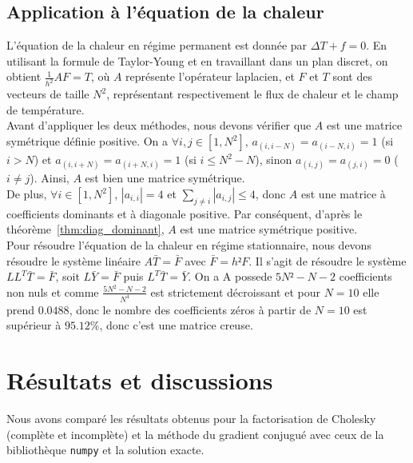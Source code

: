 \documentclass{article}
\begin{document}
\subsection{Application à l’équation de la chaleur}
L’équation de la chaleur en régime permanent est donnée par $\Delta T + f = 0$. En utilisant la formule de Taylor-Young et en travaillant dans un plan discret, on obtient $\frac{1}{h^2}AF=T$, où $A$ représente l'opérateur laplacien, et $F$ et $T$ sont des vecteurs de taille $N^2$, représentant respectivement le flux de chaleur et le champ de température.\\
Avant d'appliquer les deux méthodes, nous devons vérifier que $A$ est une matrice symétrique définie positive. On a $\forall i,j \in [1,N^2]$, $a_{(i,i-N)}=a_{(i-N,i)}=1$ (si $i>N$) et $a_{(i,i+N)}=a_{(i+N,i)}=1$ (si $i \leq N^2-N$), sinon $a_{(i,j)}=a_{(j,i)}=0$ ($i \neq j$). Ainsi, $A$ est bien une matrice symétrique.\\
De plus, $\forall i \in [1,N^2]$, $|a_{i,i}|=4$ et $\sum_{j \neq i} |a_{i,j}| \leq 4$, donc $A$ est une matrice à coefficients dominants et à diagonale positive. Par conséquent, d'après le théorème~\ref{thm:diag_dominant}, $A$ est une matrice symétrique positive.\\
Pour résoudre l'équation de la chaleur en régime stationnaire, nous devons résoudre le système linéaire $A\bar{T}=\bar{F}$ avec $\bar{F}=h²F$.
Il s'agit de résoudre le système $LL^T\bar{T}=\bar{F}$, soit $L\bar{Y}=\bar{F}$ puis $L^T\bar{T}=\bar{Y}$.
On a A possede $5N²-N-2$ coefficients non nuls et comme $\frac{5N^2-N-2}{N^4}$ est strictement décroissant et pour $N=10$ elle prend $0.0488$, donc le nombre des coefficients zéros à partir de $N=10$ est supérieur à $95.12\%$, donc c'est une matrice creuse.
\label{AN}
\section{Résultats et discussions}
Nous avons comparé les résultats obtenus pour la factorisation de Cholesky (complète et incomplète) et la méthode du gradient conjugué avec ceux de la bibliothèque \texttt{numpy} et la solution exacte.
\end{document}
